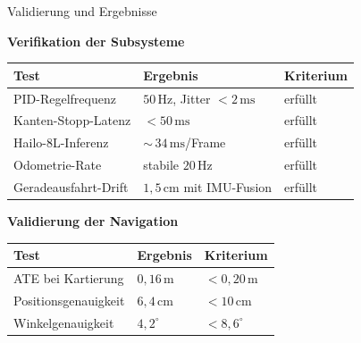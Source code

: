 \documentclass[aspectratio=169]{beamer}
\begin{document}
\begin{frame}{Validierung und Ergebnisse}

  \textbf{Verifikation der Subsysteme}

  \vspace{0.3em}
  {\small
  \begin{tabular}{@{}lll@{}}
    \toprule
    \textbf{Test} & \textbf{Ergebnis} & \textbf{Kriterium} \\
    \midrule
    PID-Regelfrequenz    & $50\,\mathrm{Hz}$, Jitter $< 2\,\mathrm{ms}$ & erfüllt \\
    Kanten-Stopp-Latenz  & $< 50\,\mathrm{ms}$                          & erfüllt \\
    Hailo-8L-Inferenz    & ${\sim}\,34\,\mathrm{ms}$/Frame              & erfüllt \\
    Odometrie-Rate       & stabile $20\,\mathrm{Hz}$                    & erfüllt \\
    Geradeausfahrt-Drift & $1{,}5\,\mathrm{cm}$ mit IMU-Fusion          & erfüllt \\
    \bottomrule
  \end{tabular}}

  \vspace{0.5em}
  \textbf{Validierung der Navigation}

  \vspace{0.3em}
  {\small
  \begin{tabular}{@{}lll@{}}
    \toprule
    \textbf{Test} & \textbf{Ergebnis} & \textbf{Kriterium} \\
    \midrule
    ATE bei Kartierung   & $0{,}16\,\mathrm{m}$ & $< 0{,}20\,\mathrm{m}$ \\
    Positionsgenauigkeit & $6{,}4\,\mathrm{cm}$  & $< 10\,\mathrm{cm}$    \\
    Winkelgenauigkeit    & $4{,}2^{\circ}$        & $< 8{,}6^{\circ}$      \\
    \bottomrule
  \end{tabular}}

\end{frame}
\end{document}
